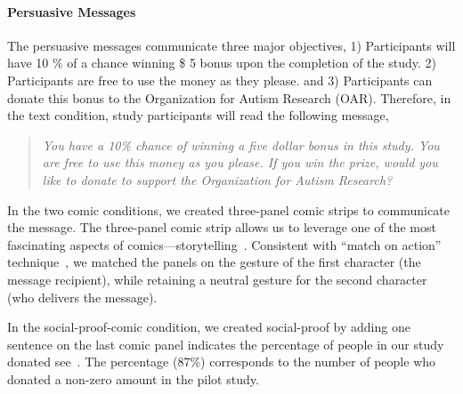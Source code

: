 \paragraph{Persuasive Messages}
The persuasive messages communicate three major objectives, 1) Participants will have 10 \% of a chance winning \$ 5 bonus upon the completion of the study. 2) Participants are free to use the money as they please. and 3) Participants can donate this bonus to the Organization for Autism Research (OAR). Therefore, in the text condition, study participants will read the following message,
\begin{quote}
  \textit{You have a 10\% chance of winning a five dollar bonus in this study. You are free to use this money as you please. If you win the prize, would you like to donate to support the Organization for Autism Research?}
\end{quote}
In the two comic conditions, we created three-panel comic strips to communicate the message. The three-panel comic strip allows us to leverage one of the most fascinating aspects of comics---storytelling~\cite{scott1993understanding}. 
Consistent with ``match on action'' technique~\cite{scott1993understanding}, we matched the panels on the gesture of the first character (the message recipient), while retaining a neutral gesture for the second character (who delivers the message). 



In the social-proof-comic condition, we created social-proof by adding one sentence on the last comic panel indicates the percentage of people in our study donated see~. The percentage (87\%) corresponds to the number of people who donated a non-zero amount in the pilot study.


